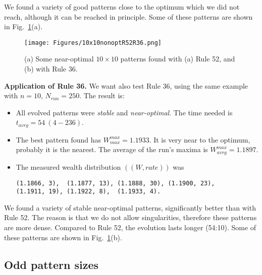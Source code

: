 \documentclass[10pt,a4paper]{article}  %
\begin{document}
We found a variety of good patterns close to the optimum which we did not reach,
although it can be reached in principle. 
Some of these patterns are shown in Fig.~\ref{10x10nonoptR52R36}(a).
		
\begin{figure}[H] 
\centering
\texttt{[image: Figures/10x10nonoptR52R36.png]}	
\caption{
(a) Some near-optimal $10 \times 10$ patterns found with (a) Rule 52, and 
(b) with Rule 36.
}
\label{10x10nonoptR52R36}
\end{figure}

    
\textbf{Application of Rule 36.}
We want also test Rule 36,
using the same example with $n=10$, $N_{run}=250$.
The result is:
\begin{itemize}
	\item 
    All evolved patterns were \textit{stable} and \textit{near-optimal}.
    The  time needed is $t_{avrg}= 54 ~(4 -236)$.
    \item
    The best pattern found has $W^{max}_{max}=1.1933$. 
    It is very near to the optimum, probably it is the nearest.
    The average of the run's maxima is $W^{max}_{avrg}=1.1897$. 
    \item
    The measured wealth distribution $((W, rate))$ was
      
    \footnotesize
    \begin{verbatim}
(1.1866, 3),  (1.1877, 13), (1.1888, 30), (1.1900, 23),
(1.1911, 19), (1.1922, 8),  (1.1933, 4).
    \end{verbatim}
    \normalsize   

\end{itemize}

We found a variety of stable near-optimal patterns, significantly better than
with Rule 52. The reason is that we do not allow singularities, therefore these patterns 
are more dense. Compared to Rule 52, the evolution lasts longer (54:10). 
Some of these patterns are shown in Fig.~\ref{10x10nonoptR52R36}(b).    


\subsection{Odd pattern sizes}
\label{Odd pattern sizes}
\end{document}
